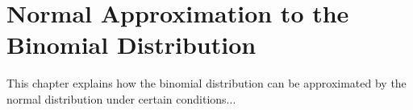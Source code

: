 \setcounter{chapter}{3}  %
\chapter{Normal Approximation to the Binomial Distribution}

This chapter explains how the binomial distribution can be approximated by the normal distribution under certain conditions...
